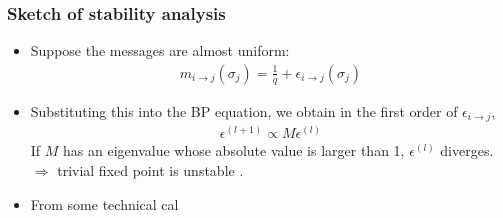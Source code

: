 \documentclass[dvipdfmx,11pt]{beamer}
\begin{document}
\begin{frame}
  \frametitle{Sketch of stability analysis}
  \begin{itemize}
    \item Suppose the messages are almost uniform:
    \begin{align*}
      m_{i \to j}(\sigma_j) = \frac{1}{q} + \epsilon_{i \to j}(\sigma_j)
    \end{align*}
    \item Substituting this into the BP equation, we obtain in the first order of $\epsilon_{i \to j}$,
    \begin{align*}
      \epsilon^{(l+1)} \propto M \epsilon^{(l)}
    \end{align*}
    If $M$ has an eigenvalue whose absolute value is larger than 1, $\epsilon^{(l)}$ diverges. \\
    $\Rightarrow$ trivial fixed point is unstable \Smiley.
  \end{itemize}
\end{frame}

\begin{itemize}
  \item From some technical cal
\end{itemize}
\end{document}
